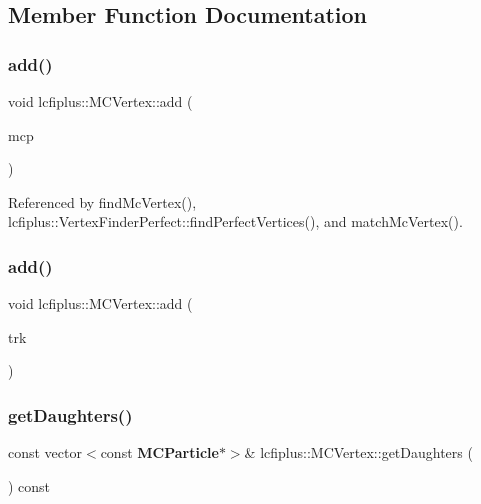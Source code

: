 \subsection{Member Function Documentation}
\mbox{\label{classlcfiplus_1_1MCVertex_a8fca0ee51e54ff037df3afbb5e8336e9}} 
\subsubsection{add()\hspace{0.1cm}{\footnotesize\ttfamily [1/2]}}
{\footnotesize\ttfamily void lcfiplus\+::\+M\+C\+Vertex\+::add (\begin{DoxyParamCaption}\item[{const \textbf{ M\+C\+Particle} $\ast$}]{mcp }\end{DoxyParamCaption})\hspace{0.3cm}{\ttfamily [inline]}}



Referenced by find\+Mc\+Vertex(), lcfiplus\+::\+Vertex\+Finder\+Perfect\+::find\+Perfect\+Vertices(), and match\+Mc\+Vertex().

\mbox{\label{classlcfiplus_1_1MCVertex_a9e23265f83e949df02501b31276e865e}} 
\subsubsection{add()\hspace{0.1cm}{\footnotesize\ttfamily [2/2]}}
{\footnotesize\ttfamily void lcfiplus\+::\+M\+C\+Vertex\+::add (\begin{DoxyParamCaption}\item[{const \textbf{ Track} $\ast$}]{trk }\end{DoxyParamCaption})\hspace{0.3cm}{\ttfamily [inline]}}

\mbox{\label{classlcfiplus_1_1MCVertex_a25c5286977e00d62dfb4f877a2fe2eb9}} 
\subsubsection{get\+Daughters()}
{\footnotesize\ttfamily const vector$<$const \textbf{ M\+C\+Particle}$\ast$$>$\& lcfiplus\+::\+M\+C\+Vertex\+::get\+Daughters (\begin{DoxyParamCaption}{ }\end{DoxyParamCaption}) const\hspace{0.3cm}{\ttfamily [inline]}}




